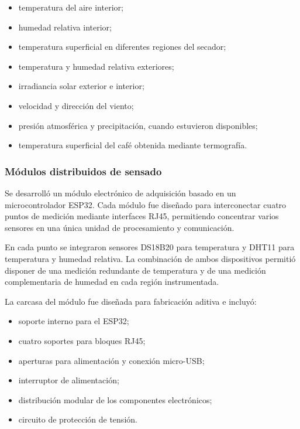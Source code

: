 \begin{itemize}
    \item temperatura del aire interior;
    \item humedad relativa interior;
    \item temperatura superficial en diferentes regiones del secador;
    \item temperatura y humedad relativa exteriores;
    \item irradiancia solar exterior e interior;
    \item velocidad y dirección del viento;
    \item presión atmosférica y precipitación, cuando estuvieron disponibles;
    \item temperatura superficial del café obtenida mediante termografía.
\end{itemize}

\subsubsection{Módulos distribuidos de sensado}
\label{subsubsec:modulos_sensado}

Se desarrolló un módulo electrónico de adquisición basado en un microcontrolador ESP32. Cada módulo fue diseñado para interconectar cuatro puntos de medición mediante interfaces RJ45, permitiendo concentrar varios sensores en una única unidad de procesamiento y comunicación.

En cada punto se integraron sensores DS18B20 para temperatura y DHT11 para temperatura y humedad relativa. La combinación de ambos dispositivos permitió disponer de una medición redundante de temperatura y de una medición complementaria de humedad en cada región instrumentada.

La carcasa del módulo fue diseñada para fabricación aditiva e incluyó:

\begin{itemize}
    \item soporte interno para el ESP32;
    \item cuatro soportes para bloques RJ45;
    \item aperturas para alimentación y conexión micro-USB;
    \item interruptor de alimentación;
    \item distribución modular de los componentes electrónicos;
    \item circuito de protección de tensión.
\end{itemize}

